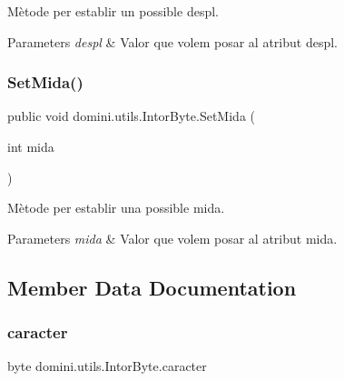 Mètode per establir un possible despl. 


\begin{DoxyParams}{Parameters}
{\em despl} & Valor que volem posar al atribut despl. \\
\hline
\end{DoxyParams}
\mbox{\label{classdomini_1_1utils_1_1IntorByte_a2371fca6d26baf4098466dbb3089052d}} 
\subsubsection{\texorpdfstring{Set\+Mida()}{SetMida()}}
{\footnotesize\ttfamily public void domini.\+utils.\+Intor\+Byte.\+Set\+Mida (\begin{DoxyParamCaption}\item[{int}]{mida }\end{DoxyParamCaption})\hspace{0.3cm}{\ttfamily [inline]}}



Mètode per establir una possible mida. 


\begin{DoxyParams}{Parameters}
{\em mida} & Valor que volem posar al atribut mida. \\
\hline
\end{DoxyParams}


\subsection{Member Data Documentation}
\mbox{\label{classdomini_1_1utils_1_1IntorByte_adbb2e8c31ead2f27d85ff39683b9a8a7}} 
\subsubsection{\texorpdfstring{caracter}{caracter}}
{\footnotesize\ttfamily byte domini.\+utils.\+Intor\+Byte.\+caracter\hspace{0.3cm}{\ttfamily [private]}}


